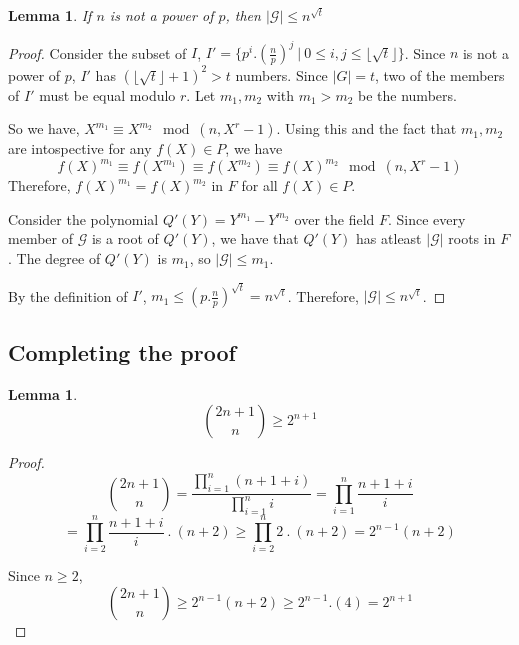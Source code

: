 \documentclass[11pt]{article}
\newtheorem{lemma}[theorem]{Lemma}
\begin{document}
\begin{lemma}
\label{lemma:GUpperBound}
If $n$ is not a power of $p$, then $|\mathcal{G}| \leq n^{\sqrt{t}}$
\end{lemma}
\begin{proof}
Consider the subset of $I$, $I' = \{p^i.(\frac{n}{p})^j\ |\ 0 \leq i, j \leq \lfloor \sqrt{t} \rfloor \}$.
Since $n$ is not a power of $p$, $I'$ has $(\lfloor \sqrt{t} \rfloor + 1)^2 > t$ numbers. Since $|G| = t$, two of the members of $I'$ must be equal modulo $r$. Let $m_1, m_2$ with $m_1 > m_2$ be the numbers. 

So we have, $X^{m_1} \equiv X^{m_2} \mod (n, X^r-1)$. Using this and the fact that $m_1, m_2$ are intospective for any $f(X) \in P$, we have 
\[f(X)^{m_1} \equiv f(X^{m_1}) \equiv f(X^{m_2}) \equiv f(X)^{m_2} \mod (n, X^r-1)\]
Therefore, $f(X)^{m_1} = f(X)^{m_2}$ in $F$ for all $f(X) \in P$. 

Consider the polynomial $Q'(Y) = Y^{m_1} - Y^{m_2}$ over the field $F$. Since every member of $\mathcal{G}$ is a root of $Q'(Y)$, we have that $Q'(Y)$ has atleast $|\mathcal{G}|$ roots in $F$. The degree of $Q'(Y)$ is $m_1$, so $|\mathcal{G}| \leq m_1$.

By the definition of $I'$, $m_1 \leq (p.\frac{n}{p})^{\sqrt{t}} = n^{\sqrt{t}}$. Therefore, $|\mathcal{G}| \leq n^{\sqrt{t}}$.

\end{proof}

\subsection{Completing the proof}
\begin{lemma}
\label{lemma:CombinationsLemma}
\[{2n+1 \choose n} \geq 2^{n+1}\]
\end{lemma}
\begin{proof}
\[{2n+1 \choose n} = \frac{\prod_{i=1}^{n}(n+1+i)}{\prod_{i=1}^{n}{i}} = \prod_{i=1}^{n}\frac{n+1+i}{i}\]
\[ = \prod_{i=2}^{n}\frac{n+1+i}{i}\ .\ (n+2) \geq \prod_{i=2}^{n}2\ .\ (n+2) = 2^{n-1}(n+2)\]

Since $n \geq 2$,
\[{2n+1 \choose n} \geq 2^{n-1}(n+2) \geq 2^{n-1}.(4) = 2^{n+1}\]
\[\]
\end{proof}
\end{document}
